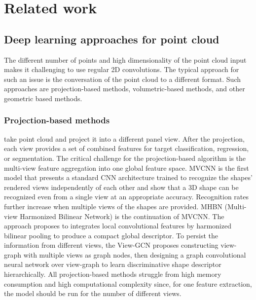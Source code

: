 \chapter{Related work}

\label{Related work}

\section{Deep learning approaches for point cloud}
The different number of points and high dimensionality of the point cloud input makes it challenging to use regular 2D convolutions. The typical approach for such an issue is the conversation of the point cloud to a different format. Such approaches are projection-based methods, volumetric-based methods, and other geometric based methods.

\subsection{Projection-based methods} take point cloud and project it into a different panel view. After the projection, each view provides a set of combined features for target classification, regression, or segmentation. The critical challenge for the projection-based algorithm is the multi-view feature aggregation into one global feature space.
MVCNN \cite{su_multi-view_2015} is the first model that presents a standard CNN architecture trained to recognize the shapes' rendered views independently of each other and show that a 3D shape can be recognized even from a single view at an appropriate accuracy. Recognition rates further increase when multiple views of the shapes are provided.
MHBN \cite{yu_multi-view_2018} (Multi-view Harmonized Bilinear Network) is the continuation of MVCNN. The approach proposes to integrates local convolutional features by harmonized bilinear pooling to produce a compact global descriptor.
To persist the information from different views, the View-GCN \cite{wei_view-gcn_2020} proposes constructing view-graph with multiple views as graph nodes, then designing a graph convolutional neural network over view-graph to learn discriminative shape descriptor hierarchically.
All projection-based methods struggle from high memory consumption and high computational complexity since, for one feature extraction, the model should be run for the number of different views.

